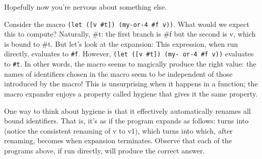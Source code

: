 
Hopefully now you’re nervous about something else.

Consider the macro \verb|(let ([v #t]) (my-or-4 #f v))|. What would we expect
this to compute? Naturally, \#t: the first branch is \#f but the second is v,
which is bound to \#t. But let’s look at the expansion:
This expression, when run directly, evaluates to \verb|#f|. However,
\verb|(let ([v #t]) (my- or-4 #f v))| evaluates to \verb|#t|. In other words,
the macro seems to magically produce the right value: the names of identifiers
chosen in the macro seem to be independent of those introduced by the macro!
This is unsurprising when it happens in a function; the macro expander enjoys a
property called hygiene that gives it the same property.

One way to think about hygiene is that it effectively automatically renames all
bound identifiers. That is, it’s as if the program expands as follows:
turns into
(notice the consistent renaming of v to v1), which turns into
which, after renaming, becomes
when expansion terminates. Observe that each of the programs above, if run
directly, will produce the correct answer.

